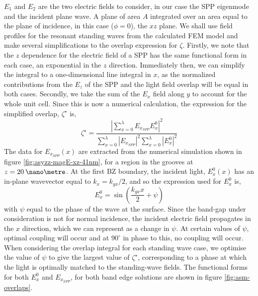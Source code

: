 $E_1$ and $E_2$ are the two electric fields to consider, in our case the SPP eigenmode and the incident plane wave. A plane of area $A$ integrated over an area equal to the plane of incidence, in this case ($\phi=0$), the $xz$ plane. We shall use field profiles for the resonant standing waves from the calculated FEM model and make several simplifications to the overlap expression for $\zeta$. Firstly, we note that the $z$ dependence for the electric field of a SPP has the same functional form in each case, an exponential in the $z$ direction. Immediately then, we can simplify the integral to a one-dimensional line integral in $x$, as the normalized contributions from the $E_z$ of the SPP and the light field overlap will be equal in both cases. Secondly, we take the sum of the $E_x$ field along $y$ to account for the whole unit cell. Since this is now a numerical calculation, the expression for the simplified overlap, $\zeta^\star$ is,
\begin{equation}
\zeta^\star=\frac{|\sum_{x=0}^\lambda E_{x_{SPP}} E_{x}^0|^2}{\sum_{x=0}^\lambda |E_{x_{SPP}}|^2\sum_{x=0}^\lambda |E_{x}^0|^2}
\end{equation}
The data for $E_{x_{SPP}}(x)$ are extracted from the numerical simulation shown in figure \ref{fig:asyzz-magE-xz-41nm}, for a region in the grooves at $z=20\:\nano\metre$. At the first BZ boundary, the incident light, $E_x^0(x)$ has an in-plane wavevector equal to $k_x=k_{gx}/2$, and so the expression used for $E_x^0$ is,
\begin{equation}
E_x^0=\sin \left(\frac{k_{gx}x}{2}+\psi\right)
\end{equation} 
with $\psi$ equal to the phase of the wave at the surface. Since the band-gap under consideration is not for normal incidence, the incident electric field propagates in the $x$ direction, which we can represent as a change in $\psi$. At certain values of $\psi$, optimal coupling will occur and at $90^\circ$ in phase to this, no coupling will occur. When considering the overlap integral for each standing wave case, we optimise the value of $\psi$ to give the largest value of $\zeta^\star$, corresponding to a phase at which the light is optimally matched to the standing-wave fields. The functional forms for both $E_x^0$ and $E_{x_{SPP}}$, for both band edge solutions are shown in figure \ref{fig:asm-overlaps}. 

